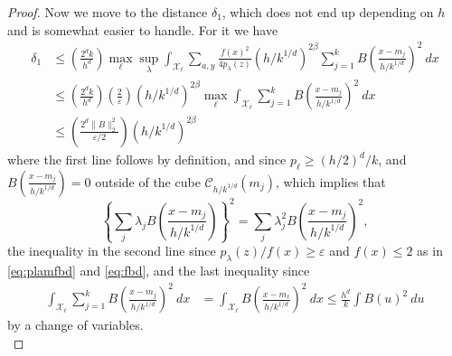 \documentclass[11pt,twoside]{article}
\theoremstyle{definition}
\theoremstyle{remark}
\begin{document}
\begin{proof}
Now we move to the distance $\delta_1$, which does not end up depending on $h$ and is somewhat easier to handle. For it we have 
\begin{align*}
\delta_1 %
&\leq \left( \frac{2^d k}{h^d}  \right) \max_\ell \sup_\lambda \int_{\mathcal{X}_\ell}  \sum_{a,y} \frac{f(x)^2  }{4 p_\lambda(z)}  \left( h/k^{1/d} \right)^{2\beta} \sum_{j=1}^k B \left( \frac{x-m_j}{h/k^{1/d}}  \right)^2 \ dx \\
&\leq \left( \frac{2^d k}{h^d} \right) \left( \frac{2}{\varepsilon} \right)    \left( h/k^{1/d} \right)^{2\beta}  \max_\ell \int_{\mathcal{X}_\ell}  \sum_{j=1}^k B \left( \frac{x-m_j}{h/k^{1/d}}  \right)^2 \ dx  \\
&\leq \left( \frac{2^d \|B \|_2^2}{\varepsilon/2} \right)  \left( h/k^{1/d} \right)^{2\beta}
\end{align*}
where the first line follows by definition, and since $p_\ell \geq (h/2)^d/k$, and $B \left( \frac{x-m_j}{h/k^{1/d}}  \right)=0$  outside of the cube $\mathcal{C}_{h/k^{1/d}}(m_j)$, which implies that 
$$\left\{ \sum_j \lambda_j B \left( \frac{x-m_j}{h/k^{1/d}}  \right) \right\}^2 %
= \sum_j \lambda_j^2 B \left( \frac{x-m_j}{h/k^{1/d}}  \right)^2, $$ 
the inequality in the second line since $p_\lambda(z)/f(x) \geq \varepsilon$ and $f(x) \leq 2$ as in \eqref{eq:plamfbd} and \eqref{eq:fbd}, and the last inequality since
\begin{align*}
\int_{\mathcal{X}_\ell } \sum_{j=1}^k  B \left( \frac{x-m_j}{h/k^{1/d}}  \right)^2 \ dx &=  \int_{\mathcal{X}_\ell }  B \left( \frac{x-m_\ell}{h/k^{1/d}}  \right)^2  \ dx \leq \frac{h^d}{k} \int B(u)^2 \ du
\end{align*}
by a change of variables.  \\


\end{proof}
\end{document}
